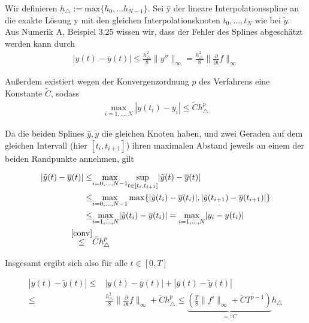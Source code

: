 \begin{solution}
  Wir definieren $h_{\triangle}:=\text{max}\{h_{0},...h_{N-1}\}$.
  Sei \=y der lineare Interpolationsspline an die exakte Lösung y mit den gleichen Interpolationsknoten $t_{0},...,t_{N}$ wie bei $\tilde{y}$.
  Aus Numerik A, Beispiel 3.25 wissen wir, dass der Fehler des Splines abgeschätzt werden kann durch
  \begin{align*}
    |y(t)-\overline{y}(t)| \leq \frac{h_{\triangle}^{2}}{8}\|y''\|_{\infty} = \frac{h_{\triangle}^{2}}{8}\|\frac{\partial}{\partial t} f\|_{\infty}
  \end{align*}

  Außerdem existiert wegen der Konvergenzordnung $p$ des Verfahrens eine Konstante $\tilde{C}$, sodass
  \begin{align}\label{conv}
    \underset{i=1,...,N}{\max} |y(t_{i})-y_{i}| \leq \tilde{C}h_{\triangle}^{p}
  \end{align}

  Da die beiden Splines $\bar{y}, \tilde{y}$ die gleichen Knoten haben, und zwei Geraden auf dem gleichen Intervall (hier $[t_{i},t_{i+1}]$) ihren maximalen Abstand jeweils an einem der beiden Randpunkte annehmen, gilt

  \begin{align*}
    |\tilde{y}(t)-\overline{y}(t)| \leq& \underset{i=0,...,N-1}{\max} \underset{t \in [t_{i},t_{i+1}]}{\sup} |\tilde{y}(t)-\overline{y}(t)| \\
    \leq& \underset{i=0,...,N-1}{\max} \max \{|\tilde{y}(t_{i})-\overline{y}(t_{i})|, |\tilde{y}(t_{i+1})-\overline{y}(t_{i+1})| \} \\
    \leq& \underset{i=1,...,N}{\max}|\tilde{y}(t_{i})-\overline{y}(t_{i})| = \underset{i=1,...,N}{\max}|y_{i}- y(t_{i})| \\
    \stackrel{\eqref{conv}}{\leq}& \tilde{C}h_{\triangle}^{p}
  \end{align*}

  Insgesamt ergibt sich also für alle $t \in [0,T]$

  \begin{align*}
    |y(t)-\tilde{y}(t)| \leq& |y(t)-\overline{y}(t)| + |\overline{y}(t)-\tilde{y}(t)| \\
    \leq& \frac{h_{\triangle}^{2}}{8}\|\frac{\partial}{\partial t} f\|_{\infty} + \tilde{C}h_{\triangle}^{p} \leq \underbrace{(\frac{T}{8}\|f'\|_{\infty} + \tilde{C}T^{p-1})}_{=:C} h_{\triangle}
  \end{align*}


\end{solution}
